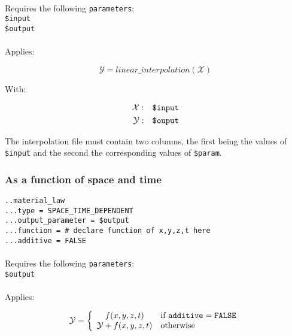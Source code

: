 \documentclass[10pt]{article}
\begin{document}
\paragraph{}Requires the following \verb+parameters+:\\

\noindent \verb+$input+\\
\verb+$output+

\paragraph{}Applies:

\begin{equation}
	\mathcal{Y} = linear\_interpolation(\mathcal{X})
\end{equation}

With:

\begin{eqnarray}
	\mathcal{X} & : & \verb+$input+ \notag \\
	\mathcal{Y} & : & \verb+$ouput+\notag  
\end{eqnarray}

The interpolation file must contain two columns, the first being the values of \verb+$input+ and the second the corresponding values of \verb+$param+.

\subsubsection{As a function of space and time}

\noindent \verb+..material_law+\\
\verb+...type = SPACE_TIME_DEPENDENT+\\
\verb+...output_parameter = $output+\\
\verb+...function = # declare function of x,y,z,t here+\\
\verb+...additive = FALSE+

\paragraph{}Requires the following \verb+parameters+:\\

\noindent \verb+$output+

\paragraph{}Applies:

\begin{equation}
	\mathcal{Y} = \left\{ \begin{array}{cl} f(x,y,z,t) & \text{if }\verb+additive+ = \verb+FALSE+  \\ \mathcal{Y} +f(x,y,z,t) & \text{otherwise} \end{array} \right.
\end{equation}
\end{document}
